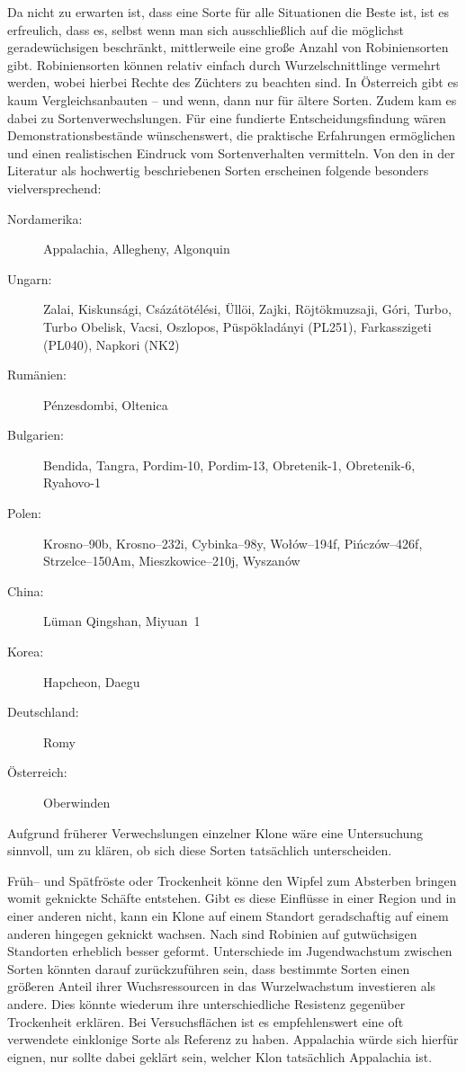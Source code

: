 \documentclass[twocolumn]{scrartcl}
\begin{document}
Da nicht zu erwarten ist, dass eine Sorte für alle Situationen die
Beste ist, ist es erfreulich, dass es, selbst wenn man sich
ausschließlich auf die möglichst geradewüchsigen beschränkt, mittlerweile eine
große Anzahl von Robiniensorten gibt. Robiniensorten können relativ
einfach durch Wurzelschnittlinge vermehrt werden, wobei hierbei Rechte
des Züchters zu beachten sind.
In Österreich gibt es kaum Vergleichsanbauten -- und wenn, dann nur für ältere Sorten.
Zudem kam es dabei zu Sortenverwechslungen.
Für eine fundierte Entscheidungsfindung wären Demonstrationsbestände wünschenswert,
die praktische Erfahrungen ermöglichen und einen realistischen Eindruck vom Sortenverhalten vermitteln.
Von den in der Literatur als hochwertig beschriebenen Sorten erscheinen folgende besonders vielversprechend:

\begin{description}
  \item[Nordamerika:] Appalachia, Allegheny, Algonquin
  \item[Ungarn:] Zalai, Kiskunsági, Csázátötélési, Üllöi, Zajki, Röjtökmuzsaji, Góri, Turbo, Turbo Obelisk, Vacsi, Oszlopos, Püspökladányi (PL251), Farkasszigeti (PL040), Napkori (NK2)
  \item[Rumänien:] Pénzesdombi, Oltenica
  \item[Bulgarien:] Bendida, Tangra, Pordim-10, Pordim-13, Obretenik-1, Obretenik-6, Ryahovo-1
  \item[Polen:] Krosno--90b, Krosno--232i, Cybinka--98y, Wołów--194f, Pińczów--426f, Strzelce--150Am, Mieszkowice--210j, Wyszanów
  \item[China:] Lüman Qingshan, Miyuan~1
  \item[Korea:] Hapcheon, Daegu
  \item[Deutschland:] Romy
  \item[Österreich:] Oberwinden
\end{description}

Aufgrund früherer Verwechslungen einzelner Klone
\citep{heinze2014robinie,liesebach2012robinie} wäre eine Untersuchung
sinnvoll, um zu klären, ob sich diese Sorten tatsächlich
unterscheiden.

Früh-- und Spätfröste oder Trockenheit könne den Wipfel zum Absterben
bringen womit geknickte Schäfte entstehen. Gibt es diese Einflüsse in
einer Region und in einer anderen nicht, kann ein Klone auf einem
Standort geradschaftig auf einem anderen hingegen geknickt wachsen.
Nach \citet[S.~48]{erteld1952robinieErtrag} sind Robinien auf
gutwüchsigen Standorten erheblich besser geformt.
Unterschiede im Jugendwachstum zwischen Sorten könnten darauf
zurückzuführen sein, dass bestimmte Sorten einen größeren Anteil ihrer
Wuchsressourcen in das Wurzelwachstum investieren als andere. Dies
könnte wiederum ihre unterschiedliche Resistenz gegenüber Trockenheit
erklären.
Bei Versuchsflächen ist es empfehlenswert eine oft verwendete einklonige
Sorte als Referenz zu haben. Appalachia würde sich hierfür eignen, nur
sollte dabei geklärt sein, welcher Klon tatsächlich Appalachia ist.
\end{document}
